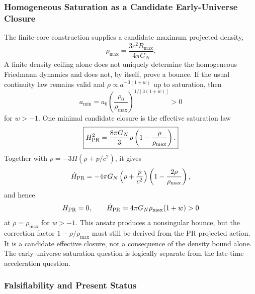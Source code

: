 \documentclass[11pt]{article}
\begin{document}
\subsubsection{Homogeneous Saturation as a Candidate Early-Universe Closure}
\label{sec:homogeneous_saturation_candidate}

The finite-core construction supplies a candidate maximum projected density,
\begin{equation}
\rho_{\max}
=
\frac{3c^2R_{\max}}{4\pi G_N}.
\end{equation}
A finite density ceiling alone does not uniquely determine the homogeneous Friedmann dynamics and does not, by itself, prove a bounce. If the usual continuity law remains valid and \(\rho\propto a^{-3(1+w)}\) up to saturation, then
\begin{equation}
a_{\min}
=
a_0
\left(
\frac{\rho_0}{\rho_{\max}}
\right)^{1/[3(1+w)]}
>
0
\end{equation}
for \(w>-1\). One minimal candidate closure is the effective saturation law
\begin{equation}
\boxed{
H_{\rm PR}^2
=
\frac{8\pi G_N}{3}
\rho
\left(
1-
\frac{\rho}{\rho_{\max}}
\right).
}
\end{equation}
Together with \(\dot\rho=-3H(\rho+p/c^2)\), it gives
\begin{equation}
\dot H_{\rm PR}
=
-4\pi G_N
\left(
\rho+
\frac{p}{c^2}
\right)
\left(
1-
\frac{2\rho}{\rho_{\max}}
\right),
\end{equation}
and hence
\begin{equation}
H_{\rm PR}=0,
\qquad
\dot H_{\rm PR}
=
4\pi G_N\rho_{\max}(1+w)>0
\end{equation}
at \(\rho=\rho_{\max}\) for \(w>-1\). This ansatz produces a nonsingular bounce, but the correction factor \(1-\rho/\rho_{\max}\) must still be derived from the PR projected action. It is a candidate effective closure, not a consequence of the density bound alone. The early-universe saturation question is logically separate from the late-time acceleration question.

\subsubsection{Falsifiability and Present Status}
\label{sec:cosmology_falsifiability_status}
\end{document}
